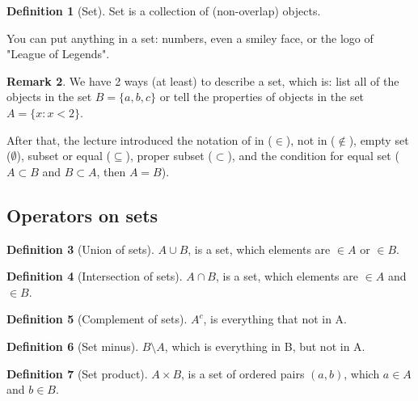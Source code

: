 \documentclass[12pt]{article}
\theoremstyle{definition}
\newtheorem{definition}{Definition}[section]
\newtheorem{remark}[definition]{Remark}
\theoremstyle{plain}
\begin{document}
\begin{definition}[Set]
Set is a collection of (non-overlap) objects.
\end{definition}

\begin{note}
You can put anything in a set: numbers, even a smiley face, or the logo of "League of Legends".
\end{note}





\begin{remark}
We have 2 ways (at least) to describe a set, which is: list all of the objects in the set $B = \{a, b, c\}$ or tell the properties of objects in the set $A = \{x: x<2\}$.
\end{remark}

After that, the lecture introduced the notation of in ($\in$), not in ($\notin$), empty set ($\emptyset$), subset or equal ($\subseteq$), proper subset ($\subset$), and the condition for equal set ($A \subset B$ and $B \subset A$, then $A = B$).

\subsection{Operators on sets}

\begin{definition}[Union of sets]
$A \cup B$, is a set, which elements are $\in A$ or $\in B$.
\end{definition}

\begin{definition}[Intersection of sets]
$A \cap B$, is a set, which elements are $\in A$ and $\in B$.    
\end{definition}

\begin{definition}[Complement of sets]
$A^c$, is everything that not in A.
\end{definition}

\begin{definition}[Set minus]
$B \setminus A$, which is everything in B, but not in A.
\end{definition}

\begin{definition}[Set product]
$A \times B$, is a set of ordered pairs $(a, b)$, which $a \in A$ and $b \in B$.    
\end{definition}
\end{document}
